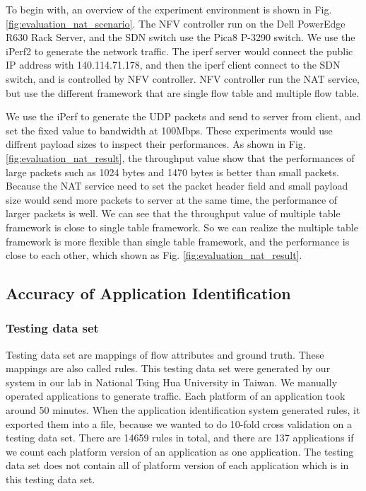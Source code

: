 \documentclass[journal]{IEEEtran}
\begin{document}
To begin with, an overview of the experiment environment is shown in Fig. \ref{fig:evaluation_nat_scenario}.
The NFV controller run on the Dell PowerEdge R630 Rack Server,
and the SDN switch use the Pica8 P-3290 switch.
We use the iPerf2 to generate the network traffic.
The iperf server would connect the public IP address with 140.114.71.178, and then the iperf client connect to the SDN switch, and is controlled by NFV controller.
NFV controller run the NAT service, but use the different framework that are single flow table and multiple flow table.

We use the iPerf  to generate the UDP packets and send to server from client, and set the fixed value to bandwidth at 100Mbps. These experiments would use diffrent payload sizes to inspect their performances.
As shown in Fig. \ref{fig:evaluation_nat_result}, the throughput value show that the performances of large packets such as 1024 bytes and 1470 bytes is better than small packets. Because the NAT service need to set the packet header field and small payload size would send more packets to server at the same time, the performance of larger packets is well. We can see that the throughput value of multiple table framework is close to single table framework. So we can realize the multiple table framework is more flexible than single table framework, and the performance is close to each other, which shown as Fig. \ref{fig:evaluation_nat_result}.



\subsection{Accuracy of Application Identification}
\subsubsection{Testing data set}
Testing data set are mappings of flow attributes and ground truth. These mappings are also called rules. This testing data set were generated by our system in our lab in National Tsing Hua University in Taiwan. We manually operated applications to generate traffic. Each platform of an application took around 50 minutes. When the application identification system generated rules, it exported them into a file, because we wanted to do 10-fold cross validation on a testing data set. There are 14659 rules in total, and there are 137 applications if we count each platform version of an application as one application. The testing data set does not contain all of platform version of each application which is in this testing data set.
\end{document}
